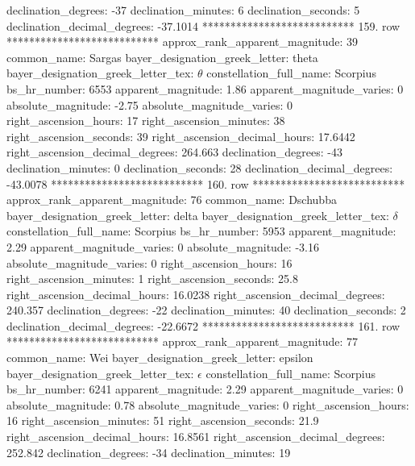                declination_degrees: -37
               declination_minutes: 6
               declination_seconds: 5
       declination_decimal_degrees: -37.1014
*************************** 159. row ***************************
    approx_rank_apparent_magnitude: 39
                       common_name: Sargas
    bayer_designation_greek_letter: theta
bayer_designation_greek_letter_tex: $\theta$
           constellation_full_name: Scorpius
                      bs_hr_number: 6553
                apparent_magnitude: 1.86
         apparent_magnitude_varies: 0
                absolute_magnitude: -2.75
         absolute_magnitude_varies: 0
             right_ascension_hours: 17
           right_ascension_minutes: 38
           right_ascension_seconds: 39
     right_ascension_decimal_hours: 17.6442
   right_ascension_decimal_degrees: 264.663
               declination_degrees: -43
               declination_minutes: 0
               declination_seconds: 28
       declination_decimal_degrees: -43.0078
*************************** 160. row ***************************
    approx_rank_apparent_magnitude: 76
                       common_name: Dschubba
    bayer_designation_greek_letter: delta
bayer_designation_greek_letter_tex: $\delta$
           constellation_full_name: Scorpius
                      bs_hr_number: 5953
                apparent_magnitude: 2.29
         apparent_magnitude_varies: 0
                absolute_magnitude: -3.16
         absolute_magnitude_varies: 0
             right_ascension_hours: 16
           right_ascension_minutes: 1
           right_ascension_seconds: 25.8
     right_ascension_decimal_hours: 16.0238
   right_ascension_decimal_degrees: 240.357
               declination_degrees: -22
               declination_minutes: 40
               declination_seconds: 2
       declination_decimal_degrees: -22.6672
*************************** 161. row ***************************
    approx_rank_apparent_magnitude: 77
                       common_name: Wei
    bayer_designation_greek_letter: epsilon
bayer_designation_greek_letter_tex: $\epsilon$
           constellation_full_name: Scorpius
                      bs_hr_number: 6241
                apparent_magnitude: 2.29
         apparent_magnitude_varies: 0
                absolute_magnitude: 0.78
         absolute_magnitude_varies: 0
             right_ascension_hours: 16
           right_ascension_minutes: 51
           right_ascension_seconds: 21.9
     right_ascension_decimal_hours: 16.8561
   right_ascension_decimal_degrees: 252.842
               declination_degrees: -34
               declination_minutes: 19
